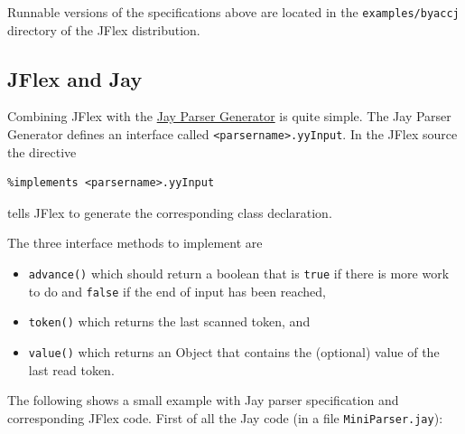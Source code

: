 Runnable versions of the specifications above are located in the
\texttt{examples/byaccj} directory of the JFlex distribution.

\subsection{JFlex and Jay}\label{jflex-and-jay}

Combining JFlex with the
\href{http://www.cs.rit.edu/~ats/projects/lp/doc/jay/package-summary.html}{Jay
Parser Generator} \autocite{Jay} is quite simple. The Jay Parser
Generator defines an interface called
\texttt{\textless{}parsername\textgreater{}.yyInput}. In the JFlex
source the directive

\begin{verbatim}
%implements <parsername>.yyInput
\end{verbatim}

tells JFlex to generate the corresponding class declaration.

The three interface methods to implement are

\begin{itemize}
\item
  \texttt{advance()} which should return a boolean that is \texttt{true}
  if there is more work to do and \texttt{false} if the end of input has
  been reached,
\item
  \texttt{token()} which returns the last scanned token, and
\item
  \texttt{value()} which returns an Object that contains the (optional)
  value of the last read token.
\end{itemize}

The following shows a small example with Jay parser specification and
corresponding JFlex code. First of all the Jay code (in a file
\texttt{MiniParser.jay}):

